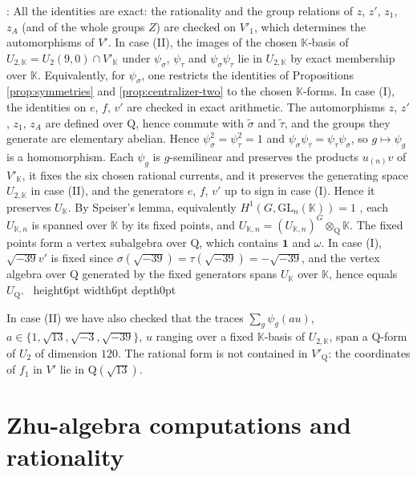\documentclass[leqno]{article}
\newcommand{\K}{\ensuremath{\mathbb{K}}}
\newcommand{\Q}{\mathrm{Q}}
\newcommand{\qed}{\hfill \vrule height6pt  width6pt depth0pt}
\newcommand{\ot}{\otimes}
\newenvironment{proof}[1][]{\noindent {\it Proof #1} : }{\hbox{~}\qed
\smallskip
}
\numberwithin{equation}{section}
\begin{document}
\begin{proof}
All the identities are exact: the rationality and the group relations of $z$, $z'$, $z_1$, $z_A$ (and of the whole groups $Z$) are checked on $V'_1$, which determines the automorphisms of $V'$. In case (II), the images of the chosen $\K$-basis of $U_{2,\K} = U_2(9,0) \cap V'_\K$ under $\psi_\sigma$, $\psi_\tau$ and $\psi_\sigma\psi_\tau$ lie in $U_{2,\K}$ by exact membership over $\K$. Equivalently, for $\psi_\sigma$, one restricts the identities of Propositions \ref{prop:symmetries} and \ref{prop:centralizer-two} to the chosen $\K$-forms. In case (I), the identities on $e$, $f$, $v'$ are checked in exact arithmetic. The automorphisms $z$, $z'$, $z_1$, $z_A$ are defined over $\Q$, hence commute with $\tilde\sigma$ and $\tilde\tau$, and the groups they generate are elementary abelian. Hence $\psi_\sigma^2 = \psi_\tau^2 = 1$ and $\psi_\sigma\psi_\tau = \psi_\tau\psi_\sigma$, so $g \mapsto \psi_g$ is a homomorphism. Each $\psi_g$ is $g$-semilinear and preserves the products $u_{(n)}v$ of $V'_\K$, it fixes the six chosen rational currents, and it preserves the generating space $U_{2,\K}$ in case (II), and the generators $e$, $f$, $v'$ up to sign in case (I). Hence it preserves $U_\K$. By Speiser's lemma, equivalently $H^1(G,\mathrm{GL}_n(\K)) = 1$ \cite[Chapter X, Proposition 3]{Ser79}, each $U_{\K,n}$ is spanned over $\K$ by its fixed points, and $U_{\K,n} = (U_{\K,n})^G \ot_\Q \K$. The fixed points form a vertex subalgebra over $\Q$, which contains $\mathbf 1$ and $\omega$. In case (I), $\sqrt{-39} v'$ is fixed since $\sigma(\sqrt{-39}) = \tau(\sqrt{-39}) = -\sqrt{-39}$, and the vertex algebra over $\Q$ generated by the fixed generators spans $U_\K$ over $\K$, hence equals $U_\Q$.
\end{proof}

In case (II) we have also checked that the traces $\sum_g \psi_g(au)$, $a \in \{1,\sqrt{13},\sqrt{-3},\sqrt{-39}\}$, $u$ ranging over a fixed $\K$-basis of $U_{2,\K}$, span a $\Q$-form of $U_2$ of dimension $120$. The rational form is not contained in $V'_\Q$: the coordinates of $f_1$ in $V'$ lie in $\Q(\sqrt{13})$.

\section{Zhu-algebra computations and rationality}
\label{sec:existence}
\end{document}
